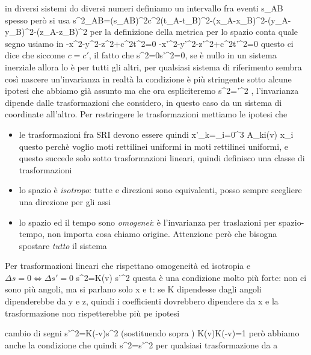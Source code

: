 in diversi sistemi do diversi numeri
definiamo un intervallo fra eventi \Delta s_{AB} 
spesso però si usa 
	\Delta s^2_{AB}=(\Delta s_{AB})^2\equiv c^2(t_A-t_B)^2-(x_A-x_B)^2-(y_A-y_B)^2-(z_A-z_B)^2
per la definizione della metrica per lo spazio conta quale segno usiamo in
	-x^2-y^2-z^2+c^2t^2=0
	-x'^2-y'^2-z'^2+c^2t'^2=0
questo ci dice che siccome $c=c'$, il fatto che 
	\Delta s^2=0\Longleftrightarrow \Delta s'^2=0, \forall{}
se è nullo in un sistema inerziale allora lo è per tutti gli altri, per qualsiasi sistema di riferimento
sembra così nascere un'invarianza
in realtà la condizione è più stringente sotto alcune ipotesi che abbiamo già assunto ma che ora espliciteremo
	\Delta s^2=\Deltas'^2 , \forall{}
l'invarianza dipende dalle trasformazioni che considero, in questo caso da un sistema di coordinate all'altro. Per restringere le trasformazioni mettiamo le ipotesi che
	\begin{itemize}
		\item 	le trasformazioni fra SRI devono essere 
		quindi		x'_k=\sum_{i=0}^3 A_{ki}(v) x_i
		questo perchè voglio moti rettilinei uniformi in moti rettilinei uniformi, e questo succede solo sotto trasformazioni lineari, quindi definisco una classe di trasformazioni
		\item	lo spazio è \textit{isotropo}: tutte e direzioni sono equivalenti, posso sempre scegliere una direzione per gli assi
		\item	lo spazio ed il tempo sono \textit{omogenei}: è l'invarianza per traslazioni per spazio-tempo, non importa cosa chiamo origine. Attenzione però che bisogna spostare \textit{tutto} il sistema
	\end{itemize}
	\item 	Per trasformazioni lineari che rispettano omogeneità ed isotropia e $\Delta s=0\iff \Delta s'=0$
		\Delta s^2=K(v) \Delta s'^2
	questa è una condizione molto più forte: non ci sono più angoli, ma si parlano solo x e t: se K dipendesse dagli angoli dipenderebbe da y e z, quindi i coefficienti dovrebbero dipendere da x e la trasformazione non rispetterebbe più pe ipotesi
	\item 	cambio di segni
			\Delta s'^2=K(-v)\Delta s^2 \implies (sostituendo sopra ) K(v)K(-v)=1
		però abbiamo anche la condizione che 
	quindi  \Delta s^2=\Delta s'^2 per qualsiasi trasformazione da  a 
	
